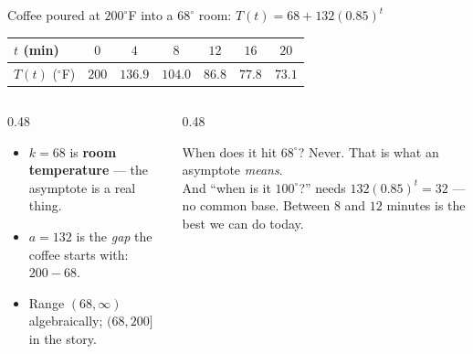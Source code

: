 \documentclass[aspectratio=169, 11pt]{beamer}
\begin{document}
\begin{frame}[t, plain]
  \begin{center}
    Coffee poured at $200^{\circ}$F into a $68^{\circ}$ room: \quad
    $T(t) = 68 + 132(0.85)^{t}$
  \end{center}
  \vspace{4pt}
  \begin{center}
  \footnotesize
  \renewcommand{\arraystretch}{1.35}
  \begin{tabular}{|l|c|c|c|c|c|c|}
  \hline
  $t$ (min) & $0$ & $4$ & $8$ & $12$ & $16$ & $20$ \\ \hline
  $T(t)$ ($^{\circ}$F) & $200$ & $136.9$ & $104.0$ & $86.8$ & $77.8$ & $73.1$ \\ \hline
  \end{tabular}
  \end{center}
  \vspace{6pt}
  \begin{columns}[T]
    \begin{column}{0.48\textwidth}
      \footnotesize
      \begin{itemize}\setlength{\itemsep}{3pt}
        \item $k=68$ is \textbf{room temperature} --- the asymptote is a real thing.
        \item $a=132$ is the \emph{gap} the coffee starts with: $200-68$.
        \item Range $(68,\infty)$ algebraically; $(68,200]$ in the story.
      \end{itemize}
    \end{column}
    \begin{column}{0.48\textwidth}
      \begin{block}{When does it hit $68^{\circ}$?}
        Never. That is what an asymptote \emph{means}. \\[3pt]
        {\scriptsize And ``when is it $100^{\circ}$?'' needs $132(0.85)^{t}=32$ --- no common base.
        Between $8$ and $12$ minutes is the best we can do today.}
      \end{block}
    \end{column}
  \end{columns}
\end{frame}
\end{document}
